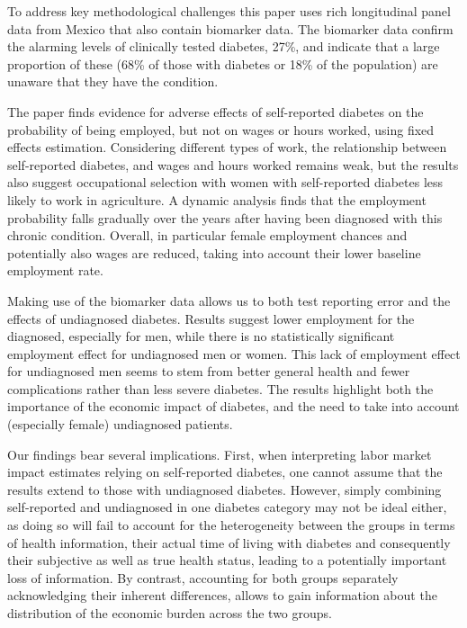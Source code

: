 \documentclass[12pt,english]{article}
\begin{document}
To address key methodological challenges this paper uses rich longitudinal panel data from Mexico that also contain biomarker data. The biomarker data confirm the alarming levels of clinically tested diabetes, 27\%, and indicate that a large proportion of these (68\% of those with diabetes or 18\% of the population) are unaware that they have the condition. 

The paper finds evidence for adverse effects of self-reported diabetes on the probability of being employed, but not on wages or hours worked, using fixed effects estimation.  Considering different types of work, the relationship between self-reported diabetes, and wages and hours worked remains weak, but the results also suggest occupational selection with women with self-reported diabetes less likely to work in agriculture.  A dynamic analysis finds that the employment probability falls gradually over the years after having been diagnosed with this chronic condition. Overall, in particular female employment chances and potentially also wages are reduced, taking into account their lower baseline employment rate.

Making use of the biomarker data allows us to both test reporting error and the effects of undiagnosed diabetes. Results suggest lower employment for the diagnosed, especially for men, while there is no statistically significant employment effect for undiagnosed men or women. This lack of employment effect for undiagnosed men seems to stem from better general health and fewer complications rather than less severe diabetes. The results highlight both the importance of the economic impact of diabetes, and the need to take into account (especially female) undiagnosed patients.

Our findings bear several implications. First, when interpreting labor market impact estimates relying on self-reported diabetes, one cannot assume that the results extend to those with undiagnosed diabetes. However, simply combining self-reported and undiagnosed in one diabetes category may not be ideal either, as doing so will fail to account for the heterogeneity between the groups in terms of health information, their actual time of living with diabetes and consequently their subjective as well as true health status, leading to a potentially important loss of information. By contrast, accounting for both groups separately acknowledging their inherent differences, allows to gain information about the distribution of the economic burden across the two groups.
\end{document}
